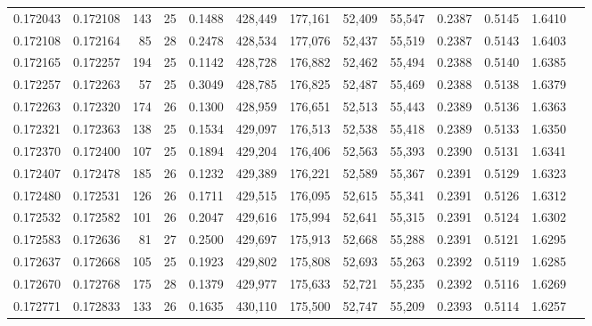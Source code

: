 \begin{tabular}{rrrrrrrrrrrrr}
0.172043 & 0.172108 & 143 &  25 &                                     0.1488 & 428,449 & 177,161 &  52,409 &  55,547 & 0.2387 & 0.5145 & 1.6410 \\
0.172108 & 0.172164 &  85 &  28 &                                     0.2478 & 428,534 & 177,076 &  52,437 &  55,519 & 0.2387 & 0.5143 & 1.6403 \\
0.172165 & 0.172257 & 194 &  25 &                                     0.1142 & 428,728 & 176,882 &  52,462 &  55,494 & 0.2388 & 0.5140 & 1.6385 \\
0.172257 & 0.172263 &  57 &  25 &                                     0.3049 & 428,785 & 176,825 &  52,487 &  55,469 & 0.2388 & 0.5138 & 1.6379 \\
0.172263 & 0.172320 & 174 &  26 &                                     0.1300 & 428,959 & 176,651 &  52,513 &  55,443 & 0.2389 & 0.5136 & 1.6363 \\
0.172321 & 0.172363 & 138 &  25 &                                     0.1534 & 429,097 & 176,513 &  52,538 &  55,418 & 0.2389 & 0.5133 & 1.6350 \\
0.172370 & 0.172400 & 107 &  25 &                                     0.1894 & 429,204 & 176,406 &  52,563 &  55,393 & 0.2390 & 0.5131 & 1.6341 \\
0.172407 & 0.172478 & 185 &  26 &                                     0.1232 & 429,389 & 176,221 &  52,589 &  55,367 & 0.2391 & 0.5129 & 1.6323 \\
0.172480 & 0.172531 & 126 &  26 &                                     0.1711 & 429,515 & 176,095 &  52,615 &  55,341 & 0.2391 & 0.5126 & 1.6312 \\
0.172532 & 0.172582 & 101 &  26 &                                     0.2047 & 429,616 & 175,994 &  52,641 &  55,315 & 0.2391 & 0.5124 & 1.6302 \\
0.172583 & 0.172636 &  81 &  27 &                                     0.2500 & 429,697 & 175,913 &  52,668 &  55,288 & 0.2391 & 0.5121 & 1.6295 \\
0.172637 & 0.172668 & 105 &  25 &                                     0.1923 & 429,802 & 175,808 &  52,693 &  55,263 & 0.2392 & 0.5119 & 1.6285 \\
0.172670 & 0.172768 & 175 &  28 &                                     0.1379 & 429,977 & 175,633 &  52,721 &  55,235 & 0.2392 & 0.5116 & 1.6269 \\
0.172771 & 0.172833 & 133 &  26 &                                     0.1635 & 430,110 & 175,500 &  52,747 &  55,209 & 0.2393 & 0.5114 & 1.6257 \\

\end{tabular}
